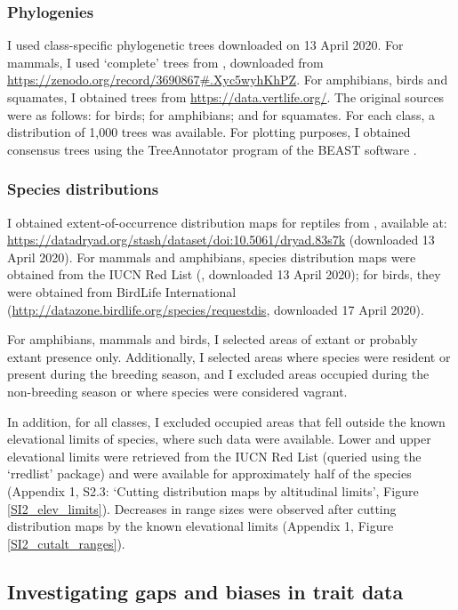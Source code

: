 \newpage
\subsubsection{Phylogenies}
I used class-specific phylogenetic trees downloaded on 13 April 2020. For mammals, I used `complete' trees from \citet{Faurby2018, Faurby2020}, downloaded from \url{https://zenodo.org/record/3690867#.Xyc5wyhKhPZ}. For amphibians, birds and squamates, I obtained trees from \url{https://data.vertlife.org/}. The original sources were as follows: \citet{Jetz2012} for birds; \citet{Jetz2018} for amphibians; and \citet{Tonini2016} for squamates. For each class, a distribution of 1,000 trees was available. For plotting purposes, I obtained consensus trees using the TreeAnnotator program of the BEAST software \citep{Bouckaert2019}.

\subsubsection{Species distributions}
I obtained extent-of-occurrence distribution maps for reptiles from \citet{Roll2017}, available at: \url{https://datadryad.org/stash/dataset/doi:10.5061/dryad.83s7k} (downloaded 13 April 2020). For mammals and amphibians, species distribution maps were obtained from the IUCN Red List (\citet{IUCN2020}, downloaded 13 April 2020); for birds, they were obtained from BirdLife International (\url{http://datazone.birdlife.org/species/requestdis}, downloaded 17 April 2020).

For amphibians, mammals and birds, I selected areas of extant or probably extant presence only. Additionally, I selected areas where species were resident or present during the breeding season, and I excluded areas occupied during the non-breeding season or where species were considered vagrant.

In addition, for all classes, I excluded occupied areas that fell outside the known elevational limits of species, where such data were available. Lower and upper elevational limits were retrieved from the IUCN Red List (queried using the `rredlist' package) and were available for approximately half of the species (Appendix 1, S2.3: `Cutting distribution maps by altitudinal limits', Figure \ref{SI2_elev_limits}). Decreases in range sizes were observed after cutting distribution maps by the known elevational limits (Appendix 1, Figure \ref{SI2_cutalt_ranges}).

\subsection{Investigating gaps and biases in trait data}

